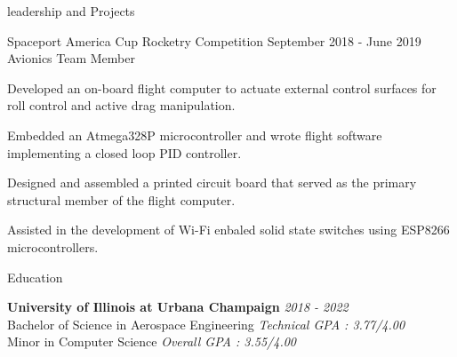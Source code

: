 \documentclass{resume} %
\begin{document}
\begin{rSection} {leadership and Projects}
        \smallskip


        \begin{rSubsection} {Spaceport America Cup Rocketry Competition} {September 2018 - June 2019} {Avionics Team Member}

            \item Developed an on-board flight computer to actuate external control surfaces for roll control and active drag manipulation.
            \item Embedded an Atmega328P microcontroller and wrote flight software implementing a closed loop PID controller.
            \item Designed and assembled a printed circuit board that served as the primary structural member of the flight computer.
            \item Assisted in the development of Wi-Fi enbaled solid state switches using ESP8266 microcontrollers.
        \end{rSubsection}

    \end{rSection}


    \begin{rSection}{Education}

        {\textbf{University of Illinois at Urbana Champaign}} \hfill {\em 2018 - 2022}\\
        Bachelor of Science in Aerospace Engineering \hfill {\em Technical GPA : 3.77/4.00} \\
        Minor in Computer Science \hfill {\em Overall GPA : 3.55/4.00}


    \end{rSection}
\end{document}

